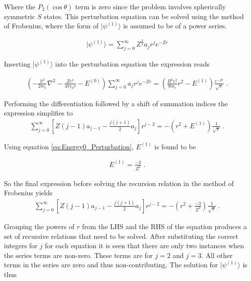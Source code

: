        \noindent Where the $P_2(\cos \theta)$ term is zero since the problem involves spherically symmetric $S$ states. This perturbation equation can be solved using the method of Frobenius, where the form of $\vert \psi^{(1)} \rangle$ is assumed to be of a power series.

        \begin{align}
            \vert \psi^{(1)} \rangle = \sum_{j = 0}^\infty Z^{\frac{3}{2}} a_j r^j e^{-Zr}
        \end{align}

        \noindent Inserting $\vert \psi^{(1)} \rangle$ into the perturbation equation the expression reads 

        \begin{align}
            \left(- \frac{\hbar^2}{2m_e} \nabla^2 - \frac{Ze^2}{4\pi \epsilon_0 r} - E^{(0)} \right) \sum_{j = 0}^\infty a_j r^j e^{-Zr} = \left(\frac{B^2e^2}{8m_e}r^2 - E^{(1)} \right) \frac{e^{-Zr}}{\sqrt{\pi}}\;.
        \end{align}

        \noindent Performing the differentiation followed by a shift of summation indices the expression simplifies to
        \begin{align}
            \sum_{j = 0}^\infty \left[ Z(j - 1)a_{j-1} - \frac{j(j+1)}{2}a_j \right]r^{j-2} = -\left(r^2 + E^{(1)} \right) \frac{1}{\sqrt{\pi}}\;.
        \end{align}

        \noindent Using equation \eqref{eq:Energy0_Perturbation}, $E^{(1)}$ is found to be 

        \begin{align}
            E^{(1)} = \frac{-3}{Z^2}\;.
        \end{align}

        \noindent So the final expression before solving the recursion relation in the method of Frobenius yields 
        \begin{align}
            \sum_{j = 0}^\infty \left[ Z(j - 1)a_{j-1} - \frac{j(j+1)}{2}a_j \right]r^{j-2} = -\left(r^2 + \frac{-3}{Z^2} \right) \frac{1}{\sqrt{\pi}}\;.
        \end{align}

        Grouping the powers of $r$ from the LHS and the RHS of the equation produces a set of recursive relations that need to be solved. After substituting the correct integers for $j$ for each equation it is seen that there are only two instances when the series terms are non-zero. These terms are for $j = 2$ and $j = 3$. All other terms in the series are zero and thus non-contributing. The solution for $\vert \psi^{(1)} \rangle$ is thus 

